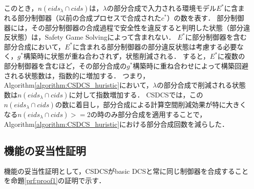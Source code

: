 このとき，$n(eids_{\lambda} \cap cids)$は，$\lambda$の部分合成で入力される環境モデル$E^*$に含まれる部分制御器（以前の合成プロセスで合成された$c^*$）の数を表す．
部分制御器には，その部分制御器の合成過程で安全性を違反すると判明した状態（部分違反状態）は，Safety Game Solvingによって含まれない．
$E^*$に部分制御器を含む部分合成において，$E^*$に含まれる部分制御器の部分違反状態は考慮する必要なく，$g^*$構築時に状態が重ね合わされず，状態削減される．
すると，$E^*$に複数の部分制御器を含むほど，その部分合成の$g^*$構築時に重ね合わせによって構築回避される状態数は，指数的に増加する．
つまり，Algorithm\ref{algorithm:CSDCS_huristic}において，$\lambda$の部分合成で削減される状態数は$n(eids_{\lambda} \cap cids)$に対して指数増加する．
CSDCSでは，この$n(eids_{\lambda} \cap cids)$の数に着目し，部分合成による計算空間削減効果が特に大きくなる$n(eids_{\lambda} \cap cids) >= 2$の時のみ部分合成を適用することで，Algorithm\ref{algorithm:CSDCS_huristic}における部分合成回数を減らした．



\subsection{機能の妥当性証明}
機能の妥当性証明として，CSDCSがbasic DCSと常に同じ制御器を合成することを命題\ref{prf:proof1}の証明で示す．

